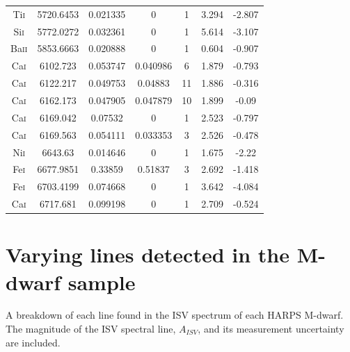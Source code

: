 \begin{longtable}{|c|c|c|c|c|c|c|}
Ti\textsc{i} & 5720.6453 & 0.021335 & 0 & 1 & 3.294 & -2.807 \\       
Si\textsc{i} & 5772.0272 & 0.032361 & 0 & 1 & 5.614 & -3.107 \\       
Ba\textsc{ii} & 5853.6663 & 0.020888 & 0 & 1 & 0.604 & -0.907 \\       
Ca\textsc{i} & 6102.723 & 0.053747 & 0.040986 & 6 & 1.879 & -0.793 \\ 
Ca\textsc{i} & 6122.217 & 0.049753 & 0.04883 & 11 & 1.886 & -0.316 \\ 
Ca\textsc{i} & 6162.173 & 0.047905 & 0.047879 & 10 & 1.899 & -0.09 \\ 
Ca\textsc{i} & 6169.042 & 0.07532 & 0 & 1 & 2.523 & -0.797 \\         
Ca\textsc{i} & 6169.563 & 0.054111 & 0.033353 & 3 & 2.526 & -0.478 \\ 
Ni\textsc{i} & 6643.63 & 0.014646 & 0 & 1 & 1.675 & -2.22 \\          
Fe\textsc{i} & 6677.9851 & 0.33859 & 0.51837 & 3 & 2.692 & -1.418 \\  
Fe\textsc{i} & 6703.4199 & 0.074668 & 0 & 1 & 3.642 & -4.084 \\       
Ca\textsc{i} & 6717.681 & 0.099198 & 0 & 1 & 2.709 & -0.524 \\        
\end{longtable}

\chapter{Varying lines detected in the M-dwarf sample}
A breakdown of each line found in the ISV spectrum of each HARPS M-dwarf. The magnitude of the ISV spectral line, $A_{ISV}$, and its measurement uncertainty are included.\\

